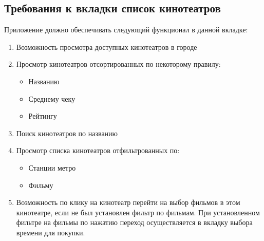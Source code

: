 \documentclass[a4paper,16pt]{article}
\begin{document}
\subsection{Требования к вкладки список кинотеатров}
Приложение должно обеспечивать следующий функционал в данной вкладке:
\begin{enumerate}
    \item Возможность просмотра доступных кинотеатров в городе
    \item Просмотр кинотеатров отсортированных по некоторому правилу:
        \begin{itemize}
            \item Названию
            \item Среднему чеку
            \item Рейтингу
        \end{itemize}
    \item Поиск кинотеатров по названию
    \item Просмотр списка кинотеатров отфильтрованных по:
        \begin{itemize}
            \item Станции метро
            \item Фильму
        \end{itemize}
    \item Возможность по клику на кинотеатр перейти на выбор фильмов в этом кинотеатре, если не был установлен фильтр по фильмам. При установленном фильтре на фильмы по нажатию переход осуществляется в вкладку выбора времени для покупки.  
\end{enumerate}
\end{document}
